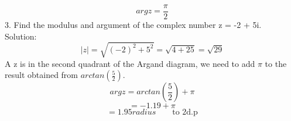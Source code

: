 \documentclass[a4paper, 12pt]{report}
\begin{document}
{\begin{equation*}
argz = \frac{\pi}{2}
\end{equation*}
3. Find the modulus and argument of the complex number z = -2 + 5i.\\
Solution:
\begin{equation}
|z| = \sqrt{(-2)^2 + 5^2} = \sqrt{4 + 25} = \sqrt{29}
\end{equation}
A z is in the second quadrant of the Argand diagram, we need to add $\pi$ to the result obtained from $arctan(\frac{5}{2})$.
\begin{equation*}
argz = arctan(\frac{5}{2}) + \pi
\end{equation*}
\begin{equation*}
= - 1.19 + \pi
\end{equation*}
\begin{equation*}
= 1.95radius \qquad\text{to 2d.p}
\end{equation*}
}
\end{document}

